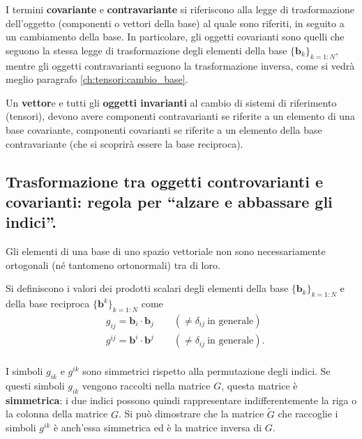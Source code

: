 %
    I termini \textbf{covariante} e \textbf{contravariante} si riferiscono alla legge di trasformazione dell'oggetto (componenti o vettori della base) al quale sono riferiti, in seguito a un cambiamento della base. In particolare, gli oggetti covarianti sono quelli che seguono la stessa legge di trasformazione degli elementi della base  $\{ \bm{b}_k \}_{k=1:N}$, mentre gli oggetti contravarianti seguono la trasformazione inversa, come si vedrà meglio paragrafo \ref{ch:tensori:cambio_base}.

    Un \textbf{vettor}e e tutti gli \textbf{oggetti invarianti} al cambio di sistemi di riferimento (tensori), devono avere componenti contravarianti se riferite a un elemento di una base covariante, componenti covarianti se riferite a un elemento della base contravariante (che si scoprirà essere la base reciproca).
  
 \subsection{Trasformazione tra oggetti controvarianti e covarianti: regola per ``alzare e abbassare gli indici''.}\label{ch:tensori:cov_contrav}
  Gli elementi di una base di uno spazio vettoriale non sono necessariamente ortogonali (né tantomeno ortonormali) tra di loro.
\begin{definition}[Simboli $g_{ij}$ e $g^{ij}$]
  Si definiscono i valori dei prodotti scalari degli elementi della base $\{ \bm{b}_k \}_{k=1:N}$ e della base 
  reciproca $\{ \bm{b}^k \}_{k=1:N}$ come
  \begin{equation}
  \begin{aligned}
      &    g_{ij} = \bm{b}_i \cdot \bm{b}_j \qquad (\neq \delta_{ij} \ \text{in generale})   \\
      &    g^{ij} = \bm{b}^i \cdot \bm{b}^j \qquad (\neq \delta_{ij} \ \text{in generale}) . \\
  \end{aligned}
  \end{equation}
\end{definition}
I simboli $g_{ik}$ e $g^{ik}$ sono simmetrici rispetto alla permutazione degli indici. Se questi simboli $g_{ik}$ vengono raccolti nella matrice $G$, questa matrice è \textbf{simmetrica}: i due indici possono quindi rappresentare indifferentemente la riga o la colonna della matrice $G$. Si può dimostrare che la matrice $\tilde{G}$ che raccoglie i simboli $g^{ik}$ è anch'essa simmetrica ed è la matrice inversa di $G$.

